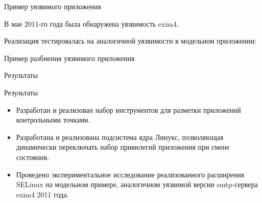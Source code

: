 \documentclass{beamer}
\begin{document}
\begin{frame}[fragile]{Пример уязвимого приложения}

\begin{small}
В мае 2011-го года была обнаружена уязвимость exim4.

Реализация тестировалась на аналогичной уязвимости в модельном приложении:
\end{small}

\scalebox{.50}{}

\end{frame}
\begin{frame}[fragile]{Пример разбиения уязвимого приложения}
\begin{figure}
\centering
\scalebox{.70}{}
\end{figure}
\end{frame}

\begin{frame}{Результаты}
\begin{block}{Результаты}
\begin{itemize}

\item Разработан и реализован набор инструментов для разметки приложений
        контрольными точками.

\item Разработана и реализована подсистема ядра Линукс, позволяющая
        динамически переключать набор привилегий приложения при
        смене состояния.

\item Проведено экспериментальное исследование реализованного расширения SELinux
        на модельном примере, аналогичном уязвимой версии smtp-сервера
        exim4 2011 года.

\end{itemize}
\end{block}
\end{frame}
\end{document}
